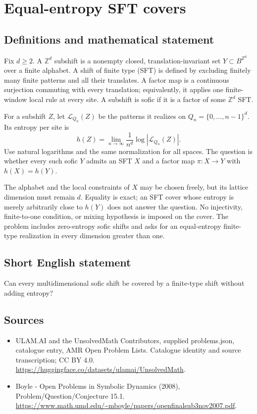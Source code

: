\documentclass[11pt,a4paper]{article}
\begin{document}
\section*{Equal-entropy SFT covers}\label{statement}

\subsection{Definitions and mathematical statement}
Fix $d\ge2$. A $\mathbb Z^d$ subshift is a nonempty closed,
translation-invariant set $Y\subset B^{\mathbb Z^d}$ over a finite
alphabet. A shift of finite type (SFT) is defined by excluding finitely
many finite patterns and all their translates. A factor map is a
continuous surjection commuting with every translation; equivalently,
it applies one finite-window local rule at every site. A subshift is
sofic if it is a factor of some $\mathbb Z^d$ SFT.

For a subshift $Z$, let $\mathcal L_{Q_n}(Z)$ be the patterns it realizes
on $Q_n=\{0,\ldots,n-1\}^d$. Its entropy per site is
\[
 h(Z)=\lim_{n\to\infty}\frac{1}{n^d}
                         \log|\mathcal L_{Q_n}(Z)|.
\]
Use natural logarithms and the same normalization for all spaces.
The question is whether every such sofic $Y$ admits an SFT $X$ and
a factor map $\pi:X\to Y$ with $h(X)=h(Y)$.

The alphabet and the local constraints of $X$ may be chosen freely,
but its lattice dimension must remain $d$. Equality is exact; an SFT
cover whose entropy is merely arbitrarily close to $h(Y)$ does not
answer the question. No injectivity, finite-to-one condition, or mixing
hypothesis is imposed on the cover. The problem includes zero-entropy
sofic shifts and asks for an equal-entropy finite-type realization in
every dimension greater than one.
\subsection{Short English statement}
Can every multidimensional sofic shift be covered by a finite-type shift without adding entropy?
\subsection{Sources}
\begin{itemize}
\item[S1] ULAM.AI and the UnsolvedMath Contributors, supplied problems.json, catalogue entry, AMR Open Problem Lists. Catalogue identity and source transcription; CC BY 4.0.
\url{https://huggingface.co/datasets/ulamai/UnsolvedMath}.
\item[S2] Boyle - Open Problems in Symbolic Dynamics (2008), Problem/Question/Conjecture 15.1. 
\url{https://www.math.umd.edu/~mboyle/papers/openfinalsub3nov2007.pdf}.
\end{itemize}
\end{document}
